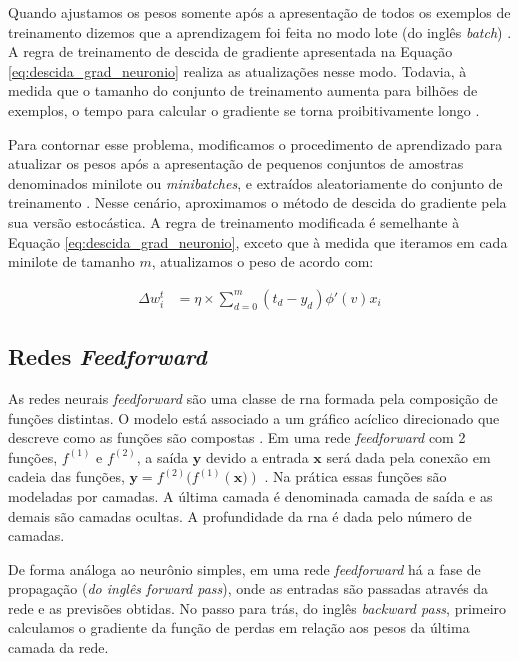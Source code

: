 Quando ajustamos os pesos somente após a apresentação de todos os exemplos de treinamento dizemos que a aprendizagem foi feita no modo lote (do inglês \textit{batch}) \cite{Haykin}.  A regra de treinamento de descida de gradiente apresentada na Equação \ref{eq:descida_grad_neuronio} realiza as atualizações nesse modo. Todavia, à medida que o tamanho do conjunto de treinamento aumenta para bilhões de exemplos, o tempo para calcular o gradiente se torna proibitivamente longo \cite{Goodfellow2016}.

Para contornar esse problema, modificamos o procedimento de aprendizado para atualizar os pesos após a apresentação de pequenos conjuntos de amostras denominados minilote ou \textit{minibatches}, e extraídos aleatoriamente do conjunto de treinamento \cite{Goodfellow2016}. Nesse cenário, aproximamos o método de descida do gradiente pela sua versão estocástica. 
A regra de treinamento modificada é semelhante à Equação \ref{eq:descida_grad_neuronio}, exceto que à medida que iteramos em cada minilote de tamanho $m$, atualizamos o peso de acordo com:

\begin{equation}
\label{eq:descida_grad__estocastica_neuronio}
\begin{aligned}
\Delta{w}^{t}_{i} &=  \eta \times \sum_{d=0}^{m} (t_{d} - y_{d})\phi'(v)x_{i}
\end{aligned}
\end{equation}


\subsection{Redes \textit{Feedforward}}

As redes neurais \textit{feedforward} são uma classe de \acrshort{rna} formada pela composição de funções distintas.  O modelo está associado a um gráfico acíclico direcionado que descreve como as funções são compostas \cite{Goodfellow2016}. Em uma rede \textit{feedforward} com 2 funções,  $f^{(1)}$ e $f^{(2)}$, a saída $\textbf{y}$ devido a entrada $\textbf{x}$  será dada pela conexão em cadeia das funções, $ \textbf{y} = f^{(2)}(f^{(1)}(\textbf{x)})$ \cite{Goodfellow2016}. Na prática essas funções são modeladas por camadas.
A última camada é denominada camada de saída e as demais são camadas ocultas. A profundidade da \acrshort{rna} é dada pelo número de camadas.  

De forma análoga ao neurônio simples, em uma rede \textit{feedforward} há a fase de propagação (\textit{do inglês forward pass}), onde as entradas são passadas através da rede e as previsões obtidas. No passo para trás, do inglês \textit{backward pass}, primeiro calculamos o gradiente da função de perdas em relação aos pesos da última camada da rede.

